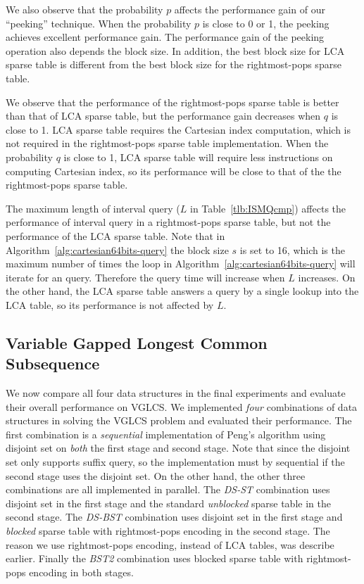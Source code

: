 

We also observe that the probability $p$ affects the performance gain of
our ``peeking'' technique.  When the probability $p$ is close to 0 or 1,
the peeking achieves excellent performance gain.  The performance gain
of the peeking operation also depends the block size.  In addition, the
best block size for LCA sparse table is different from the best block
size for the rightmost-pops sparse table.

We observe that the performance of the rightmost-pops sparse table is
better than that of LCA sparse table, but the performance gain decreases
when $q$ is close to 1.  LCA sparse table requires the Cartesian index
computation, which is not required in the rightmost-pops sparse table
implementation.  When the probability $q$ is close to 1, LCA sparse
table will require less instructions on computing Cartesian index, so
its performance will be close to that of the the rightmost-pops sparse
table.

The maximum length of interval query ($L$ in Table~\ref{tlb:ISMQcmp})
affects the performance of interval query in a rightmost-pops sparse
table, but not the performance of the LCA sparse table.  Note that in
Algorithm~\ref{alg:cartesian64bits-query} the block size $s$ is set to
16, which is the maximum number of times the loop in
Algorithm~\ref{alg:cartesian64bits-query} will iterate for an query.
Therefore the query time will increase when $L$ increases.  On the
other hand, the LCA sparse table answers a query by a single lookup
into the LCA table, so its performance is not affected by $L$.

\subsection{Variable Gapped Longest Common Subsequence}

We now compare all four data structures in the final experiments and
evaluate their overall performance on VGLCS.  We implemented {\em
  four} combinations of data structures in solving the VGLCS problem
and evaluated their performance.  The first combination is a {\em
  sequential} implementation of Peng's algorithm using disjoint set on
{\em both} the first stage and second stage.  Note that since the
disjoint set only supports suffix query, so the implementation must by
sequential if the second stage uses the disjoint set.  On the other
hand, the other three combinations are all implemented in parallel.
The {\em DS-ST} combination uses disjoint set in the first stage and
the standard {\em unblocked} sparse table in the second stage.  The
{\em DS-BST} combination uses disjoint set in the first stage and {\em
  blocked} sparse table with rightmost-pops encoding in the second
stage.  The reason we use rightmost-pops encoding, instead of LCA
tables, was describe earlier.  Finally the {\em BST2} combination uses
blocked sparse table with rightmost-pops encoding in both stages.

